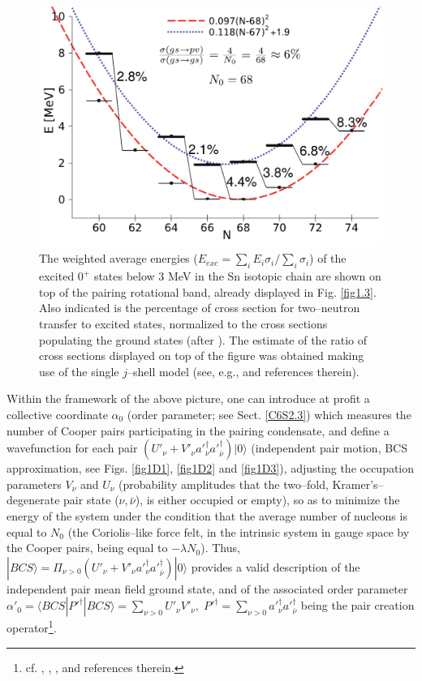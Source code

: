   \begin{figure}
  \centerline{\includegraphics*[width=\textwidth,angle=0]{nutshell/figs/fig2_1_4.pdf}}
  \caption{The weighted average energies ($E_{exc}=\sum_i E_i \sigma_i/\sum_i \sigma_i$) of the excited $0^+$ states below 3 MeV in the Sn isotopic chain are shown on top of the pairing rotational band, already displayed in Fig. \ref{fig1.3}. Also indicated is the percentage of cross section for two--neutron transfer to excited states, normalized to the cross sections populating the ground states (after \cite{Potel:13b}). The estimate of the ratio of cross sections displayed on top of the figure was obtained making use of the single $j$--shell model (see, e.g., \cite{Brink:05} and references therein).}\label{fig1.4}
  \end{figure}
Within the framework of the above picture, one can introduce at profit a collective coordinate $\alpha_0$ (order parameter; see Sect. \ref{C6S2.3}) which measures the number of Cooper pairs participating in the pairing condensate, and define a wavefunction for each pair $\left(U'_\nu+V'_\nu a'^\dagger_\nu a'^\dagger_{\bar\nu}\right)|0\rangle$ (independent pair motion, BCS approximation, see Figs. \ref{fig1D1}, \ref{fig1D2} and \ref{fig1D3}), adjusting the occupation parameters $V_\nu$ and $U_\nu$ (probability amplitudes that the two--fold, Kramer's--degenerate pair state ($\nu,\bar{\nu}$), is either occupied or empty), so as to minimize the energy of the system under the condition that the average number of nucleons is equal to $N_0$ (the Coriolis--like force felt, in the intrinsic system in gauge space by the Cooper pairs, being equal to $-\lambda N_0$). Thus, $|BCS\rangle=\Pi_{\nu>0}\left(U'_\nu+V'_\nu a'^\dagger_\nu a'^\dagger_{\bar\nu}\right)|0\rangle$ provides a valid description of the independent pair mean field ground state, and of the associated order parameter $\alpha'_0=\langle BCS|P'^{\dagger}|BCS\rangle=\sum_{\nu>0}U'_\nu V'_\nu,\; P'^{\dagger}=\sum_{\nu>0}a'^\dagger_\nu a'^\dagger_{\bar \nu}$ being the pair creation operator\footnote{cf. \cite{Bardeen:57a}, \cite{Bardeen:57b}, \cite{Schrieffer:64}, \cite{Schrieffer:73} and references therein.}.
